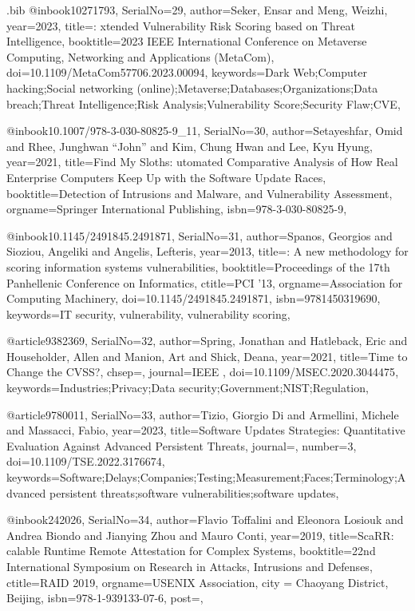 \documentclass[fleqn,s1,names,tex]{neptune}
\begin{document}
\begin{bibwrite}{\jobname.bib}
@inbook{10271793,
SerialNo={29},
author={Seker, Ensar and Meng, Weizhi},
 year={2023},
title={{}: xtended Vulnerability Risk Scoring based on Threat
  Intelligence},
booktitle={2023 IEEE International Conference on Metaverse Computing,   Networking and Applications (MetaCom)},
doi={10.1109/MetaCom57706.2023.00094},
 keywords={Dark Web;Computer hacking;Social networking
  (online);Metaverse;Databases;Organizations;Data breach;Threat
  Intelligence;Risk Analysis;Vulnerability Score;Security Flaw;CVE},
}


@inbook{10.1007/978-3-030-80825-9_11,
SerialNo={30},
author={Setayeshfar, Omid and Rhee, Junghwan ``John'' and Kim, Chung Hwan and
  Lee, Kyu Hyung},
 year={2021},
title={Find My Sloths: utomated Comparative Analysis of How Real Enterprise
  Computers Keep Up with the Software Update Races},
booktitle={Detection of Intrusions and Malware, and Vulnerability Assessment},
 orgname={Springer International Publishing},
 isbn={978-3-030-80825-9},
}


@inbook{10.1145/2491845.2491871,
SerialNo={31},
author={Spanos, Georgios and Sioziou, Angeliki and Angelis, Lefteris},
 year={2013},
title={{}: {A} new methodology for scoring information systems
  vulnerabilities},
booktitle={Proceedings of the 17th Panhellenic Conference on Informatics},
ctitle={PCI '13},
 orgname={Association for Computing Machinery},
doi={10.1145/2491845.2491871},
 isbn={9781450319690},
 keywords={IT security, vulnerability, vulnerability scoring},
}


@article{9382369,
SerialNo={32},
author={Spring, Jonathan and Hatleback, Eric and Householder, Allen and
  Manion, Art and Shick, Deana},
 year={2021},
title={Time to Change the {CVSS}?},
chsep={\chsep[atitle]{~}},
journal={IEEE {\rvtissnSecur} {\rvtissnPrivacy}},
doi={10.1109/MSEC.2020.3044475},
 keywords={Industries;Privacy;Data security;Government;NIST;Regulation},
}


@article{9780011,
SerialNo={33},
author={Tizio, Giorgio Di and Armellini, Michele and Massacci, Fabio},
 year={2023},
title={Software Updates Strategies:  Quantitative Evaluation Against Advanced
  Persistent Threats},
journal={\rvtiopIEEETransSoftwEng},
 number={3},
doi={10.1109/TSE.2022.3176674},
 keywords={Software;Delays;Companies;Testing;Measurement;Faces;Terminology;Advanced
  persistent threats;software vulnerabilities;software updates},
}


@inbook{242026,
SerialNo={34},
author={Flavio Toffalini and Eleonora Losiouk and Andrea Biondo and Jianying
  Zhou and Mauro Conti},
 year={2019},
title={{ScaRR}: calable Runtime Remote Attestation for Complex Systems},
booktitle={22nd International Symposium on Research in Attacks, Intrusions and   Defenses},
ctitle={RAID 2019},
orgname={USENIX Association},
city = {Chaoyang District, Beijing},
isbn={978-1-939133-07-6},
post={},
}



\end{bibwrite}
\end{document}
